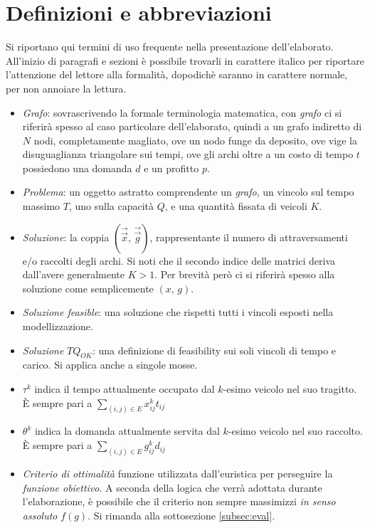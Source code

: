 \section{Definizioni e abbreviazioni}
	Si riportano qui termini di uso frequente nella presentazione dell'elaborato. All'inizio di paragrafi e sezioni è possibile trovarli
	in carattere italico per riportare l'attenzione del lettore alla formalità, dopodichè saranno in carattere normale, per non annoiare la lettura.
	\begin{itemize}
	  \item \emph{Grafo}: sovrascrivendo la formale terminologia matematica, con \emph{grafo} ci si riferirà spesso al caso
	  particolare dell'elaborato, quindi a un grafo indiretto di $N$ nodi, completamente magliato, ove un nodo funge da deposito, ove vige
	  la disuguaglianza triangolare sui tempi, ove gli archi oltre a un costo di tempo $t$ possiedono una domanda $d$ e un profitto $p$.
	  \item \emph{Problema}: un oggetto astratto comprendente un \emph{grafo}, un vincolo sul tempo massimo $T$, uno sulla capacità $Q$, e 
	  una quantità fissata di veicoli $K$.
	  \item \emph{Soluzione}: la coppia $(\vec{\vec{x}},\,\vec{\vec{g}})$, rappresentante il numero di attraversamenti e/o raccolti
	  		degli archi. Si noti che il secondo indice delle matrici deriva dall'avere generalmente $K>1$. Per brevità però ci si riferirà 
	  		spesso alla soluzione come semplicemente $(x,\,g)$.
	  \item \emph{Soluzione feasible}: una soluzione che rispetti tutti i vincoli esposti nella modellizzazione.
	  \item \emph{Soluzione} $TQ_{OK}$: una definizione di feasibility sui soli vincoli di tempo e carico. Si applica anche a singole mosse.
	  \item $\tau^k$ indica il tempo attualmente occupato dal $k$-esimo veicolo nel suo tragitto. È sempre pari a $\sum_{(i,j)\in E}x_{ij}^kt_{ij}$
	  \item $\theta^k$ indica la domanda attualmente servita dal $k$-esimo veicolo nel suo raccolto. È sempre pari a $\sum_{(i,j)\in E}g_{ij}^kd_{ij}$
	  \item \emph{Criterio di ottimalità} funzione utilizzata dall'euristica per perseguire la \emph{funzione obiettivo}. A seconda della logica
	  		che verrà adottata durante l'elaborazione, è possibile che il criterio non sempre massimizzi \emph{in senso assoluto} $f(g)$.
	  		Si rimanda alla sottosezione \ref{subsec:eval}.  

\end{itemize}
